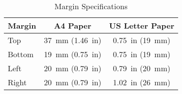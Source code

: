 \begin{table}[!hbt]
   \centering
   \caption{Margin Specifications}
   \begin{tabular}{lcc}
       \toprule
       \textbf{Margin} & \textbf{A4 Paper}                      & \textbf{US Letter Paper} \\
       \midrule
           Top         & \SI{37}{mm} (\SI{1.46}{in})            & \SI{0.75}{in} (\SI{19}{mm})        \\ %
          Bottom       & \SI{19}{mm} (\SI{0.75}{in})            & \SI{0.75}{in} (\SI{19}{mm})        \\ %
           Left        & \SI{20}{mm} (\SI{0.79}{in})            & \SI{0.79}{in} (\SI{20}{mm})        \\ %
           Right       & \SI{20}{mm} (\SI{0.79}{in})            & \SI{1.02}{in} (\SI{26}{mm})        \\
       \bottomrule
   \end{tabular}
   \label{tab:margins}
\end{table}
